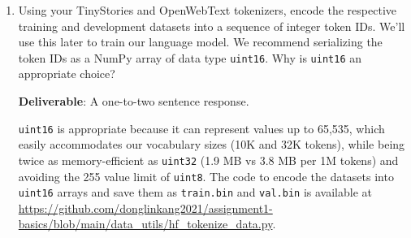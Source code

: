 \documentclass{article}
\begin{document}
\begin{enumerate}[label=(\alph*)]
    \item Using your TinyStories and OpenWebText tokenizers, encode the respective training and development datasets into a sequence of integer token IDs. We'll use this later to train our language model. We recommend serializing the token IDs as a NumPy array of data type \lstinline{uint16}. Why is \lstinline{uint16} an appropriate choice?

    \textbf{Deliverable}: A one-to-two sentence response.

    \begin{answer}
    \lstinline{uint16} is appropriate because it can represent values up to 65,535, which easily accommodates our vocabulary sizes (10K and 32K tokens), while being twice as memory-efficient as \lstinline{uint32} (1.9 MB vs 3.8 MB per 1M tokens) and avoiding the 255 value limit of \lstinline{uint8}. The code to encode the datasets into \lstinline{uint16} arrays and save them as \texttt{train.bin} and \texttt{val.bin} is available at \url{https://github.com/donglinkang2021/assignment1-basics/blob/main/data_utils/hf_tokenize_data.py}.
    \end{answer}
\end{enumerate}
\end{document}
